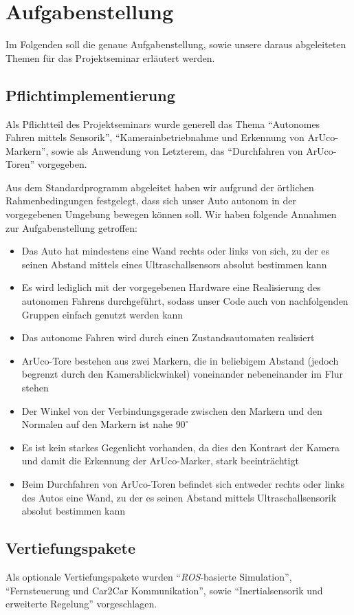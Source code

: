 \section{Aufgabenstellung}
\label{sec:aufgabenstellung}

Im Folgenden soll die genaue Aufgabenstellung, sowie unsere daraus abgeleiteten Themen für das Projektseminar erläutert werden.

\subsection{Pflichtimplementierung}
Als Pflichtteil des Projektseminars wurde generell das Thema "`Autonomes Fahren mittels Sensorik"', "`Kamerainbetriebnahme und Erkennung von ArUco-Markern"', sowie als Anwendung von Letzterem, das "`Durchfahren von ArUco-Toren"' vorgegeben.  

Aus dem Standardprogramm abgeleitet haben wir aufgrund der örtlichen Rahmenbedingungen festgelegt, dass sich unser Auto autonom in der vorgegebenen Umgebung bewegen können soll. 
Wir haben folgende Annahmen zur Aufgabenstellung getroffen:
\begin{itemize}
	\item Das Auto hat mindestens eine Wand rechts oder links von sich, zu der es seinen Abstand mittels eines Ultraschallsensors absolut bestimmen kann
	\item Es wird lediglich mit der vorgegebenen Hardware eine Realisierung des autonomen Fahrens durchgeführt, sodass unser Code auch von nachfolgenden Gruppen einfach genutzt werden kann
	\item Das autonome Fahren wird durch einen Zustandsautomaten realisiert
	\item ArUco-Tore bestehen aus zwei Markern, die in beliebigem Abstand (jedoch begrenzt durch den Kamerablickwinkel) voneinander nebeneinander im Flur stehen
	\item Der Winkel von der Verbindungsgerade zwischen den Markern und den Normalen auf den Markern ist nahe $90^\circ$
	\item Es ist kein starkes Gegenlicht vorhanden, da dies den Kontrast der Kamera und damit die Erkennung der ArUco-Marker, stark beeinträchtigt
	\item Beim Durchfahren von ArUco-Toren befindet sich entweder rechts oder links des Autos eine Wand, zu der es seinen Abstand mittels Ultraschallsensorik absolut bestimmen kann
\end{itemize}

\subsection{Vertiefungspakete}
Als optionale Vertiefungspakete wurden "`\textit{ROS}-basierte Simulation"', "`Fernsteuerung und Car2Car Kommunikation"', sowie "`Inertialsensorik und erweiterte Regelung"' vorgeschlagen.

